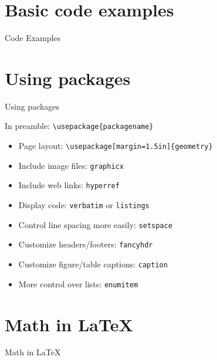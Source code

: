 \documentclass[xcolor={dvipsnames}]{beamer}
\begin{document}
\section{Basic code examples}
\begin{frame}{Code Examples}
\end{frame}


\section{Using packages}
\begin{frame}{Using packages}
\begin{block}{}
\centering
In preamble: \texttt{\textbackslash usepackage\{packagename\}}
\end{block}
\begin{itemize}
\item Page layout: \texttt{\textbackslash usepackage[margin=1.5in]\{geometry\}}
\item Include image files: \texttt{graphicx}
\item Include web links: \texttt{hyperref} 
\item Display code: \texttt{verbatim} or \texttt{listings}
\item Control line spacing more easily: \texttt{setspace}
\item Customize headers/footers: \texttt{fancyhdr}
\item Customize figure/table captions: \texttt{caption}
\item More control over lists: \texttt{enumitem}
\end{itemize}
\end{frame}

\section{Math in \LaTeX}
\begin{frame}{Math in \LaTeX}
\end{frame}
\end{document}

